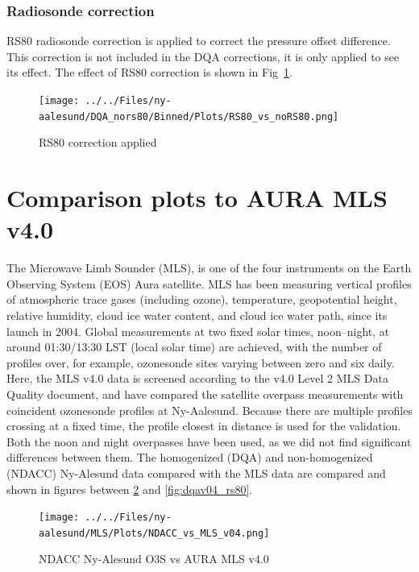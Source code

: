 \documentclass{article}
\begin{document}
 \subsubsection{Radiosonde correction}
RS80 radiosonde correction is applied to correct the pressure offset difference.
This correction is not included in the DQA corrections, it is only applied to see its effect.
The effect of RS80 correction is shown in Fig~\ref{fig:rs80}. \\

                        \begin{figure}
        \centering
\texttt{[image: ../../Files/ny-aalesund/DQA\_nors80/Binned/Plots/RS80\_vs\_noRS80.png]}
    \caption{RS80 correction applied}
            \label{fig:rs80}
    \end{figure}
%
%
\section{Comparison plots to AURA MLS v4.0}
The Microwave Limb Sounder (MLS), is one of the four instruments on the Earth Observing System (EOS) Aura satellite.
MLS has been measuring vertical profiles of atmospheric trace gases (including
ozone), temperature, geopotential height, relative humidity,
cloud ice water content, and cloud ice water path, since its
launch in 2004. Global measurements at two fixed solar
times, noon–night, at around 01:30/13:30 LST (local solar
time) are achieved, with the number of profiles over, for example, ozonesonde sites varying between zero and six daily.
Here, the MLS v4.0 data is screened according
to the v4.0 Level 2 MLS Data Quality document, and have compared the satellite overpass measurements
with coincident ozonesonde profiles at Ny-Aalesund. Because
there are multiple profiles crossing at a fixed time,
the profile closest in distance is used for the validation. Both
the noon and night overpasses have been used, as we did
not find significant differences between them.
The homogenized (DQA) and non-homogenized (NDACC) Ny-Alesund data compared with the MLS data are compared
and shown in figures between
\ref{fig:niwav04} and \ref{fig:dqav04_rs80}.

\begin{figure}
\centering
\texttt{[image: ../../Files/ny-aalesund/MLS/Plots/NDACC\_vs\_MLS\_v04.png]}
\caption{ NDACC Ny-Alesund O3S vs AURA MLS v4.0  }
\label{fig:niwav04}
\end{figure}
\end{document}
